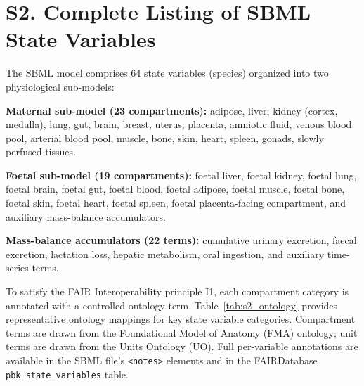 \documentclass[12pt]{article}
\begin{document}
\section*{S2. Complete Listing of SBML State Variables}


The SBML model comprises 64 state variables (species) organized
into two physiological sub-models:

\textbf{Maternal sub-model (23 compartments):} adipose, liver, kidney
(cortex, medulla), lung, gut, brain, breast, uterus, placenta,
amniotic fluid, venous blood pool, arterial blood pool, muscle, bone,
skin, heart, spleen, gonads, slowly perfused tissues.

\textbf{Foetal sub-model (19 compartments):} foetal liver, foetal
kidney, foetal lung, foetal brain, foetal gut, foetal blood, foetal
adipose, foetal muscle, foetal bone, foetal skin, foetal heart,
foetal spleen, foetal placenta-facing compartment, and auxiliary
mass-balance accumulators.

\textbf{Mass-balance accumulators (22 terms):} cumulative urinary
excretion, faecal excretion, lactation loss, hepatic metabolism,
oral ingestion, and auxiliary time-series terms.

To satisfy the FAIR Interoperability principle I1, each compartment category is annotated with a controlled ontology term. Table~\ref{tab:s2_ontology} provides representative ontology mappings for key state variable categories. Compartment terms are drawn from the Foundational Model of Anatomy (FMA) ontology; unit terms are drawn from the Units Ontology (UO). Full per-variable annotations are available in the SBML file's \texttt{<notes>} elements and in the FAIRDatabase \texttt{pbk\_state\_variables} table.
\end{document}
